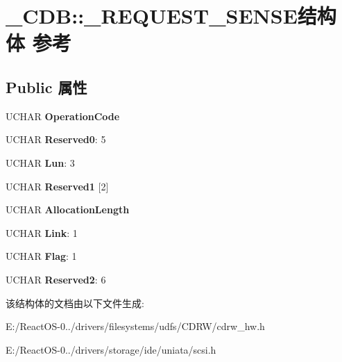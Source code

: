 \hypertarget{struct___c_d_b_1_1___r_e_q_u_e_s_t___s_e_n_s_e}{}\section{\+\_\+\+C\+DB\+:\+:\+\_\+\+R\+E\+Q\+U\+E\+S\+T\+\_\+\+S\+E\+N\+S\+E结构体 参考}
\label{struct___c_d_b_1_1___r_e_q_u_e_s_t___s_e_n_s_e}
\subsection*{Public 属性}
\begin{DoxyCompactItemize}
\item 
\mbox{\label{struct___c_d_b_1_1___r_e_q_u_e_s_t___s_e_n_s_e_a897334b8cd95f50b93e7482817654c34}} 
U\+C\+H\+AR {\bfseries Operation\+Code}
\item 
\mbox{\label{struct___c_d_b_1_1___r_e_q_u_e_s_t___s_e_n_s_e_ad2605c5716ce8444614783b1bdea2242}} 
U\+C\+H\+AR {\bfseries Reserved0}\+: 5
\item 
\mbox{\label{struct___c_d_b_1_1___r_e_q_u_e_s_t___s_e_n_s_e_aeb04b99474d387fd0b8bad2ca3a5b2b6}} 
U\+C\+H\+AR {\bfseries Lun}\+: 3
\item 
\mbox{\label{struct___c_d_b_1_1___r_e_q_u_e_s_t___s_e_n_s_e_a14814641b931fb6d1e3d3e268e368993}} 
U\+C\+H\+AR {\bfseries Reserved1} \mbox{[}2\mbox{]}
\item 
\mbox{\label{struct___c_d_b_1_1___r_e_q_u_e_s_t___s_e_n_s_e_a16697a5bf3ad726ae50f8abc57516dc5}} 
U\+C\+H\+AR {\bfseries Allocation\+Length}
\item 
\mbox{\label{struct___c_d_b_1_1___r_e_q_u_e_s_t___s_e_n_s_e_a806b0e94a54fca21868dcc6ae9394fb4}} 
U\+C\+H\+AR {\bfseries Link}\+: 1
\item 
\mbox{\label{struct___c_d_b_1_1___r_e_q_u_e_s_t___s_e_n_s_e_adb7e280863223656ac53dbb6eadf04bd}} 
U\+C\+H\+AR {\bfseries Flag}\+: 1
\item 
\mbox{\label{struct___c_d_b_1_1___r_e_q_u_e_s_t___s_e_n_s_e_aa57b5f03ae2ef867b333fe3ab22bad18}} 
U\+C\+H\+AR {\bfseries Reserved2}\+: 6
\end{DoxyCompactItemize}


该结构体的文档由以下文件生成\+:\begin{DoxyCompactItemize}
\item 
E\+:/\+React\+O\+S-\/0../drivers/filesystems/udfs/\+C\+D\+R\+W/cdrw\+\_\+hw.\+h\item 
E\+:/\+React\+O\+S-\/0../drivers/storage/ide/uniata/scsi.\+h\end{DoxyCompactItemize}
